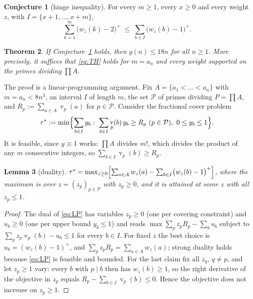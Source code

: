 \documentclass[11pt]{article}
\newtheorem{theorem}{Theorem}[section]
\newtheorem{lemma}[theorem]{Lemma}
\theoremstyle{definition}
\newtheorem{conjecture}[theorem]{Conjecture}
\DeclareMathOperator{\vp}{v}
\begin{document}
\begin{conjecture}[hinge inequality]\label{conj:TH}
For every $m\ge1$, every $x\ge0$ and every weight $z$, with $I=\{x+1,\dots,x+m\}$,
\begin{equation}\label{eq:TH}
\sum_{k=1}^{m}\bigl(w_z(k)-2\bigr)^+\;\le\;\sum_{b\in I}\bigl(w_z(b)-1\bigr)^+ .
\end{equation}
\end{conjecture}

\begin{theorem}\label{thm:cond}
If Conjecture~\ref{conj:TH} holds, then $g(n)\le 18n$ for all $n\ge1$. More precisely, it suffices that
\eqref{eq:TH} holds for $m=a_n$ and every weight supported on the primes dividing $\prod A$.
\end{theorem}

The proof is a linear-programming argument. Fix $A=\{a_1<\dots<a_n\}$ with $m=a_n<8n^3$, an interval $I$ of length
$m$, the set $\mathcal P$ of primes dividing $P=\prod A$, and $R_p:=\sum_{a\in A}\vp_p(a)$ for $p\in\mathcal P$.
Consider the fractional cover problem
\begin{equation}\label{eq:LP}
\tau^*:=\min\Bigl\{\sum_{b\in I}y_b:\ \sum_{b\in I}\vp_p(b)\,y_b\ge R_p\ (p\in\mathcal P),\ 0\le y_b\le1\Bigr\}.
\end{equation}
It is feasible, since $y\equiv1$ works: $\prod A$ divides $m!$, which divides the product of any $m$ consecutive
integers, so $\sum_{b\in I}\vp_p(b)\ge R_p$.

\begin{lemma}[duality]\label{lem:dual}
$\tau^*=\max_{z\ge0}\Bigl[\sum_{a\in A}w_z(a)-\sum_{b\in I}\bigl(w_z(b)-1\bigr)^+\Bigr]$, where the maximum is over
$z=(z_p)_{p\in\mathcal P}$ with $z_p\ge0$, and it is attained at some $z$ with all $z_p\le1$.
\end{lemma}
\begin{proof}
The dual of \eqref{eq:LP} has variables $z_p\ge0$ (one per covering constraint) and $u_b\ge0$ (one per upper bound
$y_b\le1$) and reads $\max\sum_p z_pR_p-\sum_b u_b$ subject to $\sum_p z_p\vp_p(b)-u_b\le1$ for every $b\in I$.
For fixed $z$ the best choice is $u_b=(w_z(b)-1)^+$, and $\sum_p z_pR_p=\sum_{a\in A}w_z(a)$; strong duality holds
because \eqref{eq:LP} is feasible and bounded. For the last claim fix all $z_q$, $q\ne p$, and let $z_p\ge1$ vary:
every $b$ with $p\mid b$ then has $w_z(b)\ge1$, so the right derivative of the objective in $z_p$ equals
$R_p-\sum_{b\in I}\vp_p(b)\le0$. Hence the objective does not increase on $z_p\ge1$.
\end{proof}
\end{document}
